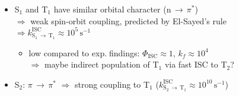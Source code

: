 \documentclass[25pt, portrait]{tikzposter}
\begin{document}
\begin{columns}
{\begin{minipage}[t]{0.595\colwidth}
{\begin{center}
        \end{center}
	 \vspace{-0.6cm}
\begin{minipage}[t]{4.25cm}
\vspace{4.9cm}
\vspace{6.3cm}
\vspace{6.2cm}
\vspace{2.4cm}
\vspace{5.4cm}
\end{minipage}
\begin{adjustbox}{valign=t}
\begin{minipage}[t]{24.6cm}
  \begin{center}
	 \vspace{-.7cm}
	  \begin{itemize}
		 \item S$_1$ and T$_1$ have similar orbital character (n{}$\,\rightarrow\,${}$\pi^*$) \\
		$\Rightarrow$ weak spin-orbit coupling, predicted by El-Sayed's rule\\$\Rightarrow k^\mathrm{ISC}_{\mathrm{S}_1\,\rightarrow\,\mathrm{T}_1}\approx 10^5 \,\mathrm{s}^{-1}$
		\begin{itemize}
			\item low compared to exp.$\;$findings: $\Phi_\mathrm{ISC}\approx1$, $k_f\approx10^4$ \cite{lawrence}
		  \\$\Rightarrow$ maybe indirect population of T$_1$ via fast ISC to T$_2$? %
		\end{itemize}
		 \item S$_2$: $\pi${}$\,\rightarrow\,${}$\pi^*$ $\Rightarrow$ strong coupling to T$_1$ ($k^\mathrm{ISC}_{\mathrm{S}_2\,\rightarrow\,\mathrm{T}_1}\approx10^{10}\,\mathrm{s}^{-1}$)
		\begin{itemize}

\end{itemize}
\end{itemize}
\end{center}
\end{minipage}
\end{adjustbox}}
\end{minipage}}
\end{columns}
\end{document}
